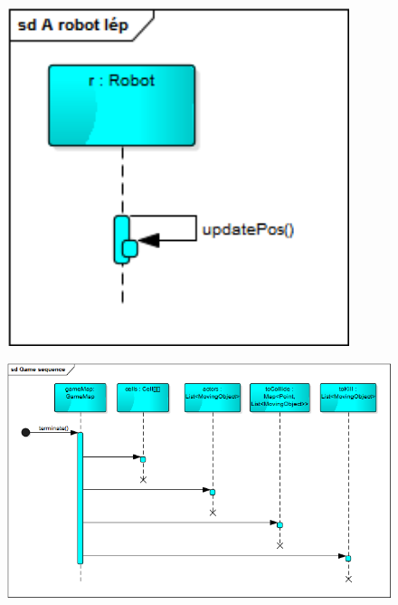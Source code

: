 \begin{figure}[!htbp]
	\begin{center}
		\includegraphics[width=100mm, center]{./chapters/chapter04/Arobotlep.png}
		\caption{}
	\end{center}
\end{figure}

\begin{figure}[!htbp]
	\begin{center}
		\includegraphics[width=180mm, center]{./chapters/chapter04/Gamesequence.png}
		\caption{}
	\end{center}
\end{figure}

